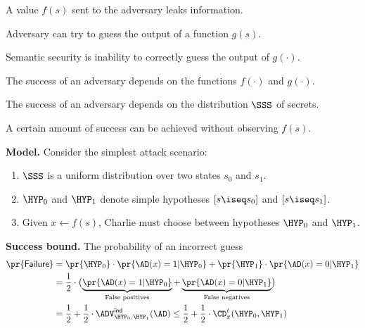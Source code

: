 \documentclass[landscape,footrule]{foils}
\newcommand{\lastline}{\vspace*{-2ex}}
\begin{document}




\begin{triangles}
  \item A value $f(s)$ sent to the adversary leaks information. 
  \item Adversary can try to guess the output of a function $g(s)$.
  \item Semantic security is inability to correctly guess the output of $g(\cdot)$.
  \item The success of an adversary depends on the functions $f(\cdot)$ and $g(\cdot)$.
  \item The success of an adversary depends on the distribution $\SSS$ of secrets. 
  \item A certain amount of success can be achieved without observing $f(s)$.
  \lastline
\end{triangles}



\textbf{Model.} Consider the simplest attack scenario:
\begin{enumerate}
\item $\SSS$ is a uniform distribution over two
  states $s_0$ and $s_1$.
\item $\HYP_0$ and $\HYP_1$ denote simple hypotheses $[\smash{s\iseq s_0}]$ and
  $[\smash{s\iseq s_1}]$.
\item Given $x\gets f(s)$, Charlie must choose between hypotheses $\HYP_0$ and $\HYP_1$.
\end{enumerate}
\Bigskip


\textbf{Success bound.} The probability of an incorrect guess
\begin{align*}
 \pr{\mathsf{Failure}}
 &=\pr{\HYP_0}\cdot\pr{\AD(x)=1|\HYP_0}
   +\pr{\HYP_1}\cdot\pr{\AD(x)=0|\HYP_1}\\
 &=\frac{1}{2}\cdot\bigl(
   \underbrace{\pr{\AD(x)=1|\HYP_0}}_{\text{False positives}}
  +\underbrace{\pr{\AD(x)=0|\HYP_1}}_{\text{False negatives}}\bigr)\\
 &=\frac{1}{2}+\frac{1}{2}\cdot\advINDXX{\HYP_0,\HYP_1}{\AD}
  \leq\frac{1}{2}+\frac{1}{2}\cdot\CD_x^t(\HYP_0,\HYP_1)
\end{align*}
\end{document}
